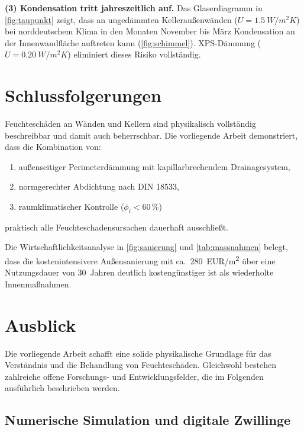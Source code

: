 ﻿\documentclass[a4paper,12pt]{article}
\theoremstyle{definition}
\begin{document}
\textbf{(3) Kondensation tritt jahreszeitlich auf.}
Das Glaserdiagramm in \cref{fig:taupunkt} zeigt, dass an unged\"ammten
Kellerau\ss{}enw\"anden ($U = \SI{1.5}{W/m^2K}$) bei norddeutschem Klima
in den Monaten November bis M\"arz Kondensation an der Innenwandfl\"ache
auftreten kann (\cref{fig:schimmel}). XPS-D\"ammung ($U = \SI{0.20}{W/m^2K}$)
eliminiert dieses Risiko vollst\"andig.

\section{Schlussfolgerungen}
\label{sec:fazit}

Feuchtesch\"aden an W\"anden und Kellern sind physikalisch vollst\"andig
beschreibbar und damit auch beherrschbar. Die vorliegende Arbeit
demonstriert, dass die Kombination von:
\begin{enumerate}
  \item au\ss{}enseitiger Perimeterd\"ammung mit kapillarbrechendem Drainagesystem,
  \item normgerechter Abdichtung nach DIN 18533,
  \item raumklimatischer Kontrolle ($\phi_i < 60\,\%$)
\end{enumerate}
praktisch alle Feuchteschadensursachen dauerhaft ausschlie\ss{}t.

Die Wirtschaftlichkeitsanalyse in \cref{fig:sanierung} und
\cref{tab:massnahmen} belegt, dass die kostenintensivere Au\ss{}ensanierung
mit ca.~\SI{280}{EUR/m^2} \"uber eine Nutzungsdauer von 30~Jahren
deutlich kosteng\"unstiger ist als wiederholte Innenma\ss{}nahmen.

\section{Ausblick}
\label{sec:ausblick}

Die vorliegende Arbeit schafft eine solide physikalische Grundlage
f\"ur das Verst\"andnis und die Behandlung von Feuchtesch\"aden.
Gleichwohl bestehen zahlreiche offene Forschungs- und Entwicklungsfelder,
die im Folgenden ausf\"uhrlich beschrieben werden.

\subsection{Numerische Simulation und digitale Zwillinge}
\end{document}
